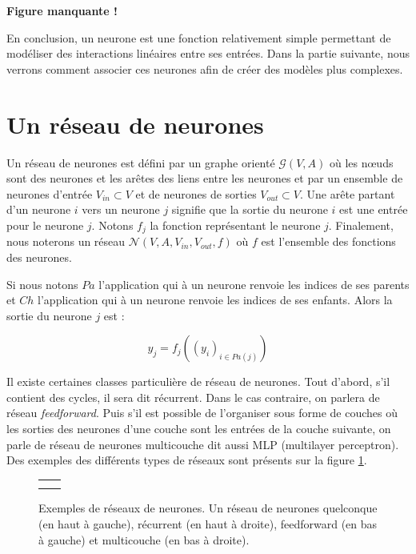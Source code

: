 \documentclass{report}
\begin{document}
\textbf{Figure manquante !}

En conclusion, un neurone est une fonction relativement simple permettant de modéliser des interactions linéaires entre ses entrées. Dans la partie suivante, nous verrons comment associer ces neurones afin de créer des modèles plus complexes.

\section{Un réseau de neurones}

Un réseau de neurones est défini par un graphe orienté $\mathcal{G}(V, A)$ où les n\oe{}uds sont des neurones et les arêtes des liens entre les neurones et par un ensemble de neurones d'entrée $V_{in} \subset V$ et de neurones de sorties $V_{out} \subset V$. Une arête partant d'un neurone $i$ vers un neurone $j$ signifie que la sortie du neurone $i$ est une entrée pour le neurone $j$. Notons $f_{j}$ la fonction représentant le neurone $j$. Finalement, nous noterons un réseau $\mathcal{N}(V, A, V_{in}, V_{out}, f)$ où $f$ est l'ensemble des fonctions des neurones.

Si nous notons $Pa$ l'application qui à un neurone renvoie les indices de ses parents et $Ch$ l'application qui à un neurone renvoie les indices de ses enfants. Alors la sortie du neurone $j$ est :

\begin{equation}
y_{j} = f_{j}((y_{i})_{i \in Pa(j)})
\label{eq_propagation}
\end{equation} 

Il existe certaines classes particulière de réseau de neurones. Tout d'abord, s'il contient des cycles, il sera dit récurrent. Dans le cas contraire, on parlera de réseau \textit{feedforward}. Puis s'il est possible de l'organiser sous forme de couches où les sorties des neurones d'une couche sont les entrées de la couche suivante, on parle de réseau de neurones multicouche dit aussi MLP (multilayer perceptron). Des exemples des différents types de réseaux sont présents sur la figure \ref{reseaux}.

\begin{figure}
\begin{center}
\begin{tabular}{cc}
 &  \\
 &  \\
\end{tabular}
\caption{Exemples de réseaux de neurones. Un réseau de neurones quelconque (en haut à gauche),  récurrent (en haut à droite), feedforward (en bas à gauche) et multicouche (en bas à droite).} 
\label{reseaux}
\end{center}
\end{figure}
\end{document}
